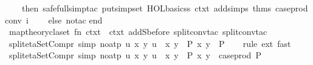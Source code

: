 \begin{isabellebody}
\ \ \ \ then\ safe{\isacharunderscore}{\kern0pt}full{\isacharunderscore}{\kern0pt}simp{\isacharunderscore}{\kern0pt}tac\ {\isacharparenleft}{\kern0pt}put{\isacharunderscore}{\kern0pt}simpset\ HOL{\isacharunderscore}{\kern0pt}basic{\isacharunderscore}{\kern0pt}ss\ ctxt\ addsimps\ {\isacharat}{\kern0pt}{\isacharbraceleft}{\kern0pt}thms\ case{\isacharunderscore}{\kern0pt}prod{\isacharunderscore}{\kern0pt}conv{\isacharbraceright}{\kern0pt}{\isacharparenright}{\kern0pt}\ i\isanewline
\ \ \ \ else\ no{\isacharunderscore}{\kern0pt}tac{\isacharparenright}{\kern0pt}{\isacharsemicolon}{\kern0pt}\isanewline
end{\isacharsemicolon}{\kern0pt}\isanewline
{\isacartoucheclose}\isanewline
\isanewline
\isanewline
{}\isamarkupfalse%
\ {\isacartoucheopen}map{\isacharunderscore}{\kern0pt}theory{\isacharunderscore}{\kern0pt}claset\ {\isacharparenleft}{\kern0pt}fn\ ctxt\ {\isacharequal}{\kern0pt}{\isachargreater}{\kern0pt}\ ctxt\ addSbefore\ {\isacharparenleft}{\kern0pt}{\isachardoublequote}{\kern0pt}split{\isacharunderscore}{\kern0pt}conv{\isacharunderscore}{\kern0pt}tac{\isachardoublequote}{\kern0pt}{\isacharcomma}{\kern0pt}\ split{\isacharunderscore}{\kern0pt}conv{\isacharunderscore}{\kern0pt}tac{\isacharparenright}{\kern0pt}{\isacharparenright}{\kern0pt}{\isacartoucheclose}%
\endisatagML
{\isafoldML}%
%
\isadelimML
\isanewline
%
\endisadelimML
\isanewline
{}\isamarkupfalse%
\ split{\isacharunderscore}{\kern0pt}eta{\isacharunderscore}{\kern0pt}SetCompr\ {\isacharbrackleft}{\kern0pt}simp{\isacharcomma}{\kern0pt}\ no{\isacharunderscore}{\kern0pt}atp{\isacharbrackright}{\kern0pt}{\isacharcolon}{\kern0pt}\ {\isachardoublequoteopen}{\isacharparenleft}{\kern0pt}{\isasymlambda}u{\isachardot}{\kern0pt}\ {\isasymexists}x\ y{\isachardot}{\kern0pt}\ u\ {\isacharequal}{\kern0pt}\ {\isacharparenleft}{\kern0pt}x{\isacharcomma}{\kern0pt}\ y{\isacharparenright}{\kern0pt}\ {\isasymand}\ P\ {\isacharparenleft}{\kern0pt}x{\isacharcomma}{\kern0pt}\ y{\isacharparenright}{\kern0pt}{\isacharparenright}{\kern0pt}\ {\isacharequal}{\kern0pt}\ P{\isachardoublequoteclose}\isanewline
%
\isadelimproof
\ \ %
\endisadelimproof
%
\isatagproof
{}\isamarkupfalse%
\ {\isacharparenleft}{\kern0pt}rule\ ext{\isacharparenright}{\kern0pt}\ fast%
\endisatagproof
{\isafoldproof}%
%
\isadelimproof
\isanewline
%
\endisadelimproof
\isanewline
{}\isamarkupfalse%
\ split{\isacharunderscore}{\kern0pt}eta{\isacharunderscore}{\kern0pt}SetCompr{}\ {\isacharbrackleft}{\kern0pt}simp{\isacharcomma}{\kern0pt}\ no{\isacharunderscore}{\kern0pt}atp{\isacharbrackright}{\kern0pt}{\isacharcolon}{\kern0pt}\ {\isachardoublequoteopen}{\isacharparenleft}{\kern0pt}{\isasymlambda}u{\isachardot}{\kern0pt}\ {\isasymexists}x\ y{\isachardot}{\kern0pt}\ u\ {\isacharequal}{\kern0pt}\ {\isacharparenleft}{\kern0pt}x{\isacharcomma}{\kern0pt}\ y{\isacharparenright}{\kern0pt}\ {\isasymand}\ P\ x\ y{\isacharparenright}{\kern0pt}\ {\isacharequal}{\kern0pt}\ case{\isacharunderscore}{\kern0pt}prod\ P{\isachardoublequoteclose}\isanewline

\end{isabellebody}
